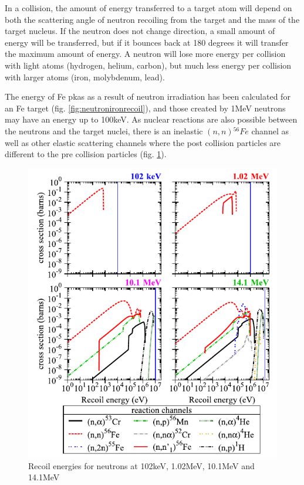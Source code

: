 In a collision, the amount of energy transferred to a target atom will depend on both the scattering angle of neutron recoiling from the target and the mass of the target nucleus.  If the neutron does not change direction, a small amount of energy will be transferred, but if it bounces back at 180 degrees it will transfer the maximum amount of energy.  A neutron will lose more energy per collision with light atoms (hydrogen, helium, carbon), but much less energy per collision with larger atoms (iron, molybdenum, lead).


The energy of Fe \acrshort{pka}s as a result of neutron irradiation has been calculated for an Fe target\cite{pkaenergyspectra} (fig. \ref{fig:neutronironrecoil}), and those created by 1MeV neutrons may have an energy up to 100keV.  As nuclear reactions are also possible between the neutrons and the target nuclei, there is an inelastic $(n,n) {}^{56}Fe$ channel as well as other elastic scattering channels where the post collision particles are different to the pre collision particles (fig. \ref{fig:ferecoilchannels}).

\begin{figure}[ht]
  \begin{center}
    \includegraphics[width=.65\linewidth]{chapters/austenitic_steels_in_nuclear/images/neutronrecoils.png}
    \caption{Recoil energies for neutrons at 102keV, 1.02MeV, 10.1MeV and 14.1MeV\cite{pkaenergyspectra}}
    \label{fig:ferecoilchannels}
  \end{center}
\end{figure}
\FloatBarrier






